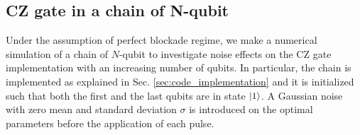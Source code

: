 \documentclass[rmp,10pt,onecolumn,fleqn,notitlepage]{revtex4-1}
\begin{document}
\subsection{CZ gate in a chain of N-qubit}

Under the assumption of perfect blockade regime, we make a numerical simulation of a chain of $N$-qubit to investigate noise effects on the CZ gate implementation with an increasing number of qubits. In particular, the chain is implemented as explained in Sec. \ref{sec:code_implementation} and it is initialized such that both the first and the last qubits are in state $\left\vert{1}\right\rangle$. 
A Gaussian noise with zero mean and standard deviation $\sigma$ is introduced on the optimal parameters before the application of each pulse.

\begin{figure}[H]
\begin{minipage}[c]{0.49\linewidth}
\end{minipage}
\begin{minipage}[]{0.49\linewidth}
\centering
{}

\end{minipage}
\end{figure}
\end{document}
